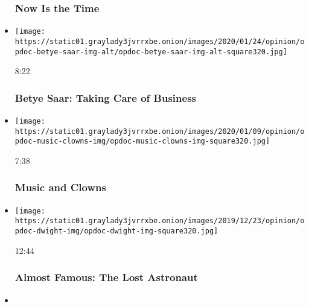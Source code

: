 \begin{itemize}
  \hypertarget{now-is-the-time}{%
  \subsubsection{Now Is the Time}\label{now-is-the-time}}
\item
  \href{https://www.nytimes3xbfgragh.onion/video/opinion/100000006923399/betye-saar-taking-care-of-business.html?action=click\&module=video-series-bar\&region=header\&pgtype=Article\&playlistId=video/op-docs}{}

  \texttt{[image: https://static01.graylady3jvrrxbe.onion/images/2020/01/24/opinion/opdoc-betye-saar-img-alt/opdoc-betye-saar-img-alt-square320.jpg]}

  8:22

  \hypertarget{betye-saar-taking-care-of-business}{%
  \subsubsection{Betye Saar: Taking Care of
  Business}\label{betye-saar-taking-care-of-business}}
\item
  \href{https://www.nytimes3xbfgragh.onion/video/opinion/100000006831435/music-and-clowns.html?action=click\&module=video-series-bar\&region=header\&pgtype=Article\&playlistId=video/op-docs}{}

  \texttt{[image: https://static01.graylady3jvrrxbe.onion/images/2020/01/09/opinion/opdoc-music-clowns-img/opdoc-music-clowns-img-square320.jpg]}

  7:38

  \hypertarget{music-and-clowns}{%
  \subsubsection{Music and Clowns}\label{music-and-clowns}}
\item
  \href{https://www.nytimes3xbfgragh.onion/video/opinion/100000006865864/almost-famous-the-lost-astronaut.html?action=click\&module=video-series-bar\&region=header\&pgtype=Article\&playlistId=video/op-docs}{}

  \texttt{[image: https://static01.graylady3jvrrxbe.onion/images/2019/12/23/opinion/opdoc-dwight-img/opdoc-dwight-img-square320.jpg]}

  12:44

  \hypertarget{almost-famous-the-lost-astronaut}{%
  \subsubsection{Almost Famous: The Lost
  Astronaut}\label{almost-famous-the-lost-astronaut}}
\item
  \href{https://www.nytimes3xbfgragh.onion/video/opinion/100000006865876/almost-famous-the-other-fab-four.html?action=click\&module=video-series-bar\&region=header\&pgtype=Article\&playlistId=video/op-docs}{}


\end{itemize}
